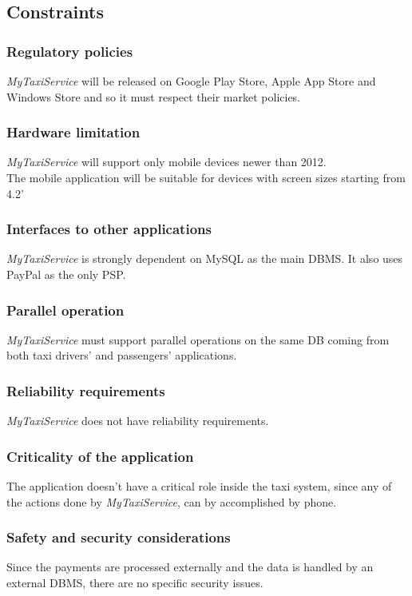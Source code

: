 \documentclass{article}
\begin{document}
\subsection{Constraints}
\subsubsection{Regulatory policies}
\textit{MyTaxiService} will be released on Google Play Store, Apple App Store and Windows Store and so it must respect their market policies.
\subsubsection{Hardware limitation}
\textit{MyTaxiService} will support only mobile devices newer than 2012.\\
The mobile application will be suitable for devices with screen sizes starting from 4.2{'}
\subsubsection{Interfaces to other applications}
\textit{MyTaxiService} is strongly dependent on MySQL as the main DBMS. It also uses PayPal as the only PSP.
\subsubsection{Parallel operation}
\textit{MyTaxiService} must support parallel operations on the same DB coming from both taxi drivers' and passengers' applications.
\subsubsection{Reliability requirements}
\textit{MyTaxiService} does not have reliability requirements.
\subsubsection{Criticality of the application}
The application doesn't have a critical role inside the taxi system, since any of the actions done by \textit{MyTaxiService}, can by accomplished by phone.
\subsubsection{Safety and security considerations}
Since the payments are processed externally and the data is handled by an external DBMS, there are no specific security issues.
\end{document}
